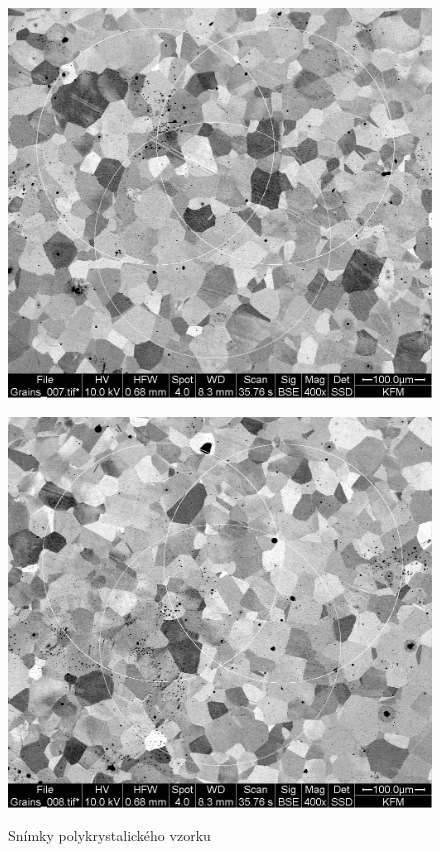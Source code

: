 \begin{figure}[!h]
    \vspace{0.5em} %

    \begin{minipage}[b]{0.48\linewidth}
        \centering
        \includegraphics[width=\linewidth]{A18 - SEM/Grains_007_circ.jpg}
        \label{fig:img3}
    \end{minipage}
    \hfill
    \begin{minipage}[b]{0.48\linewidth}
        \centering
        \includegraphics[width=\linewidth]{A18 - SEM/Grains_008_circ.jpg}
        \label{fig:img4}
    \end{minipage}

    \caption{Snímky polykrystalického vzorku }
    \label{fig:lom_rt_all}
\end{figure}


